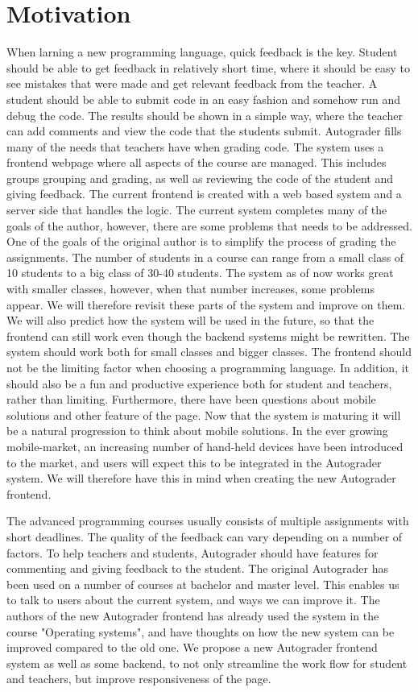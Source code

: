 \chapter*{Motivation}

When larning a new programming language, quick feedback is the key. Student should be able to get feedback in relatively short time, where it should be easy to see mistakes that were made and get relevant feedback from the teacher. A student should be able to submit code in an easy fashion and somehow run and debug the code. The results should be shown in a simple way, where the teacher can add comments and view the code that the students submit. Autograder fills many of the needs that teachers have when grading code. The system uses a frontend webpage where all aspects of the course are managed. This includes groups grouping and grading, as well as reviewing the code of the student and giving feedback. The current frontend is created with a web based system and a server side that handles the logic. The current system completes many of the goals of the author, however, there are some problems that needs to be addressed. One of the goals of the original author is to simplify the process of grading the assignments. The number of students in a course can range from a small class of 10 students to a big class of 30-40 students. The system as of now works great with smaller classes, however, when that number increases, some problems appear. We will therefore revisit these parts of the system and improve on them. We will also predict how the system will be used in the future, so that the frontend can still work even though the backend systems might be rewritten. The system should work both for small classes and bigger classes. The frontend should not be the limiting factor when choosing a programming language. In addition, it should also be a fun and productive experience both for student and teachers, rather than limiting. Furthermore, there have been questions about mobile solutions and other feature of the page. Now that the system is maturing it will be a natural progression to think about mobile solutions. In the ever growing mobile-market, an increasing number of hand-held devices have been introduced to the market, and users will expect this to be integrated in the Autograder system. We will therefore have this in mind when creating the new Autograder frontend.

The advanced programming courses usually consists of multiple assignments with short deadlines. The quality of the feedback can vary depending on a number of factors. To help teachers and students, Autograder should have features for commenting and giving feedback to the student. The original Autograder has been used on a number of courses at bachelor and master level. This enables us to talk to users about the current system, and ways we can improve it. The authors of the new Autograder frontend has already used the system in the course "Operating systems", and have thoughts on how the new system can be improved compared to the old one. We propose a new Autograder frontend system as well as some backend, to not only streamline the work flow for student and teachers, but improve responsiveness of the page.
